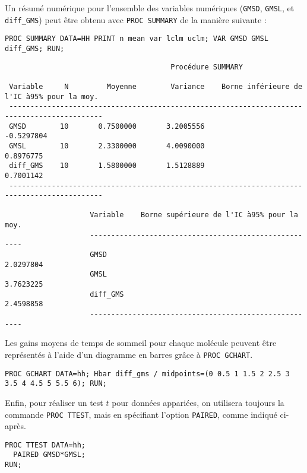Un résumé numérique pour l'ensemble des variables numériques (\texttt{GMSD},
\texttt{GMSL}, et \verb|diff_GMS|) peut être obtenu avec \texttt{PROC SUMMARY} 
de la manière suivante :
\begin{verbatim}
PROC SUMMARY DATA=HH PRINT n mean var lclm uclm; VAR GMSD GMSL diff_GMS; RUN;
\end{verbatim}

\begin{verbatim}
                                       Procédure SUMMARY

 Variable     N         Moyenne        Variance    Borne inférieure de l'IC à95% pour la moy.
 --------------------------------------------------------------------------------------------
 GMSD        10       0.7500000       3.2005556                                    -0.5297804
 GMSL        10       2.3300000       4.0090000                                     0.8976775
 diff_GMS    10       1.5800000       1.5128889                                     0.7001142
 --------------------------------------------------------------------------------------------

                    Variable    Borne supérieure de l'IC à95% pour la moy.
                    ------------------------------------------------------
                    GMSD                                         2.0297804
                    GMSL                                         3.7623225
                    diff_GMS                                     2.4598858
                    ------------------------------------------------------
\end{verbatim}

Les gains moyens de temps de sommeil pour chaque molécule peuvent être
représentés à l'aide d'un diagramme en barres grâce à \texttt{PROC GCHART}.
\begin{verbatim}
PROC GCHART DATA=hh; Hbar diff_gms / midpoints=(0 0.5 1 1.5 2 2.5 3 3.5 4 4.5 5 5.5 6); RUN;
\end{verbatim}

Enfin, pour réaliser un test $t$ pour données appariées, on utilisera toujours la
commande \texttt{PROC TTEST}, mais en spécifiant l'option \texttt{PAIRED},
comme indiqué ci-après.
\begin{verbatim}
PROC TTEST DATA=hh;
  PAIRED GMSD*GMSL;
RUN;
\end{verbatim}

